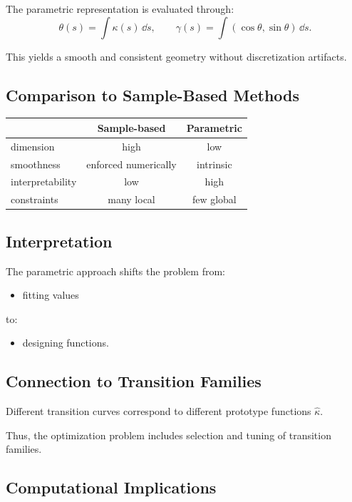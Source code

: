The parametric representation is evaluated through:
\[
\theta(s) = \int \kappa(s)\,\dd s,
\qquad
\gamma(s) = \int (\cos\theta,\sin\theta)\,\dd s.
\]

This yields a smooth and consistent geometry without discretization
artifacts.


\subsection{Comparison to Sample-Based Methods}

\begin{center}
\begin{tabular}{lcc}
\toprule
 & Sample-based & Parametric \\
\midrule
dimension & high & low \\
smoothness & enforced numerically & intrinsic \\
interpretability & low & high \\
constraints & many local & few global \\
\bottomrule
\end{tabular}
\end{center}


\subsection{Interpretation}

The parametric approach shifts the problem from:
\begin{itemize}
\item fitting values
\end{itemize}
to:
\begin{itemize}
\item designing functions.
\end{itemize}


\subsection{Connection to Transition Families}

Different transition curves correspond to different prototype functions
\(\widehat{\kappa}\).

Thus, the optimization problem includes selection and tuning of
transition families.


\subsection{Computational Implications}

